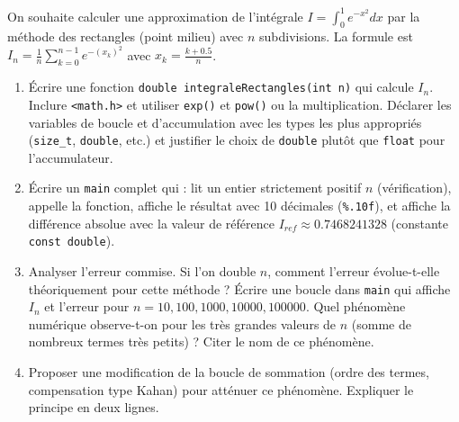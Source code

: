 \documentclass[11pt]{article}
\begin{document}
\begin{exercice}
On souhaite calculer une approximation de l'intégrale $I = \int_0^1 e^{-x^2} dx$ par la méthode des rectangles (point milieu) avec $n$ subdivisions. La formule est $I_n = \frac{1}{n} \sum_{k=0}^{n-1} e^{-(x_k)^2}$ avec $x_k = \frac{k+0.5}{n}$.

\begin{enumerate}
    \item Écrire une fonction \texttt{double integraleRectangles(int n)} qui calcule $I_n$. Inclure \texttt{<math.h>} et utiliser \texttt{exp()} et \texttt{pow()} ou la multiplication. Déclarer les variables de boucle et d'accumulation avec les types les plus appropriés (\texttt{size\_t}, \texttt{double}, etc.) et justifier le choix de \texttt{double} plutôt que \texttt{float} pour l'accumulateur.
    \item Écrire un \texttt{main} complet qui : lit un entier strictement positif $n$ (vérification), appelle la fonction, affiche le résultat avec 10 décimales (\texttt{\%.10f}), et affiche la différence absolue avec la valeur de référence $I_{ref} \approx 0.7468241328$ (constante \texttt{const double}).
    \item Analyser l'erreur commise. Si l'on double $n$, comment l'erreur évolue-t-elle théoriquement pour cette méthode ? Écrire une boucle dans \texttt{main} qui affiche $I_n$ et l'erreur pour $n = 10, 100, 1000, 10000, 100000$. Quel phénomène numérique observe-t-on pour les très grandes valeurs de $n$ (somme de nombreux termes très petits) ? Citer le nom de ce phénomène.
    \item Proposer une modification de la boucle de sommation (ordre des termes, compensation type Kahan) pour atténuer ce phénomène. Expliquer le principe en deux lignes.
\end{enumerate}
\end{exercice}
\end{document}
